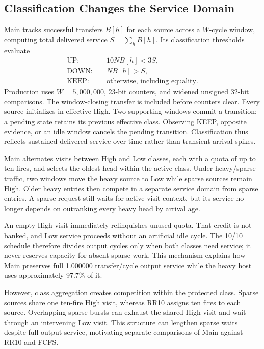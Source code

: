 \subsection{Classification Changes the Service Domain}
Main tracks successful transfers $B[h]$ for each source across a $W$-cycle window,
computing total delivered service $S=\sum_h B[h]$. Its classification thresholds evaluate
\begin{align}
 \mathrm{UP}:&\quad 10NB[h]<3S,\nonumber\\
 \mathrm{DOWN}:&\quad NB[h]>S,\label{eq:classes}\\
 \mathrm{KEEP}:&\quad \text{otherwise, including equality}.\nonumber
\end{align}
Production uses $W=5{,}000{,}000$, 23-bit counters, and widened unsigned 32-bit
comparisons. The window-closing transfer is included before counters clear. Every
source initializes in effective High. Two supporting windows commit a transition;
a pending state retains its previous effective class. Observing KEEP, opposite evidence,
or an idle window cancels the pending transition. Classification thus reflects
sustained delivered service over time rather than transient arrival spikes.

Main alternates visits between High and Low classes, each with a quota of up to ten fires,
and selects the oldest head within the active class. Under heavy/sparse traffic,
two windows move the heavy source to Low while sparse sources remain High.
Older heavy entries then compete in a separate service domain from sparse
entries. A sparse request still waits for active visit context, but its
service no longer depends on outranking every heavy head by arrival age.

An empty High visit immediately relinquishes unused quota. That credit is not
banked, and Low service proceeds without an artificial idle cycle. The 10/10 schedule
therefore divides output cycles only when both classes need service; it never reserves
capacity for absent sparse work. This mechanism explains how Main preserves
full 1.000000 transfer/cycle output service while the heavy host uses approximately 97.7\% of it.

However, class aggregation creates competition within the protected class. Sparse sources
share one ten-fire High visit, whereas RR10 assigns ten fires to each source.
Overlapping sparse bursts can exhaust the shared High visit and wait through
an intervening Low visit. This structure can lengthen sparse waits despite full output
service, motivating separate comparisons of Main against RR10 and FCFS.

